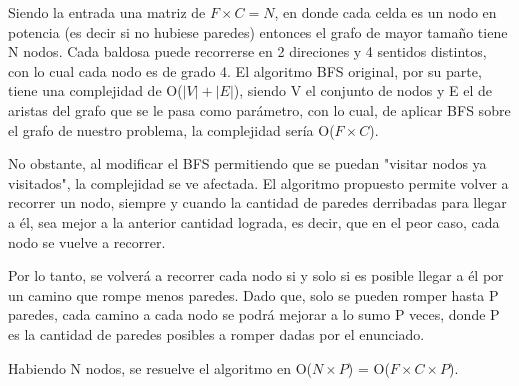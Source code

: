 Siendo la entrada una matriz de $F \times C = N$, en donde cada celda es un nodo en potencia (es decir si no hubiese paredes) entonces el grafo de mayor tamaño tiene N nodos. Cada baldosa puede recorrerse en 2 direciones y 4 sentidos distintos, con lo cual cada nodo es de grado 4. El algoritmo BFS original, por su parte, tiene una complejidad de O($|V|+|E|$), siendo V el conjunto de nodos y E el de aristas del grafo que se le pasa como parámetro, con lo cual, de aplicar BFS sobre el grafo de nuestro problema, la complejidad sería O($F \times C$).

No obstante, al modificar el BFS permitiendo que se puedan "visitar nodos ya visitados", la complejidad se ve afectada. El algoritmo propuesto permite volver a recorrer un nodo, siempre y cuando la cantidad de paredes derribadas para llegar a él, sea mejor a la anterior cantidad lograda, es decir, que en el peor caso, cada nodo se vuelve a recorrer.

Por lo tanto, se volver\'a a recorrer cada nodo si y solo si es posible llegar a él por un camino que rompe menos paredes. Dado que, solo se pueden romper hasta P paredes, cada camino a cada nodo se podr\'a mejorar a lo sumo P veces, donde P es la cantidad de paredes posibles a romper dadas por el enunciado.











 Habiendo N nodos, se resuelve el algoritmo en O($N \times P$) = O($F \times C \times P$).